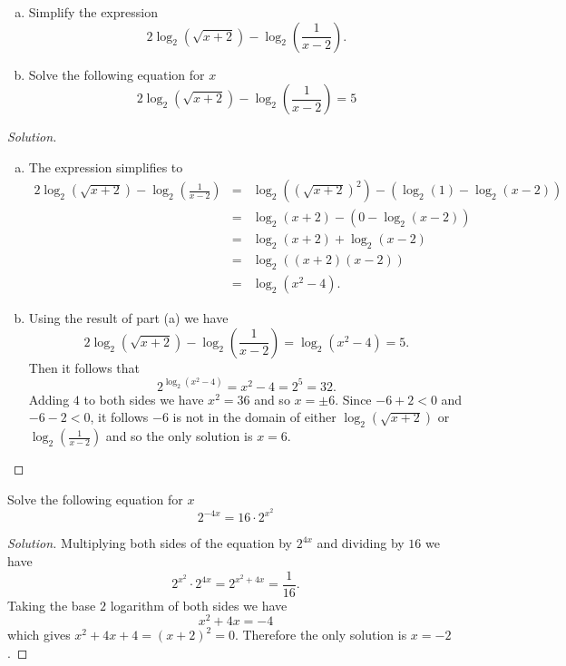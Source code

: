 \documentclass[12pt]{amsart}
\begin{document}
\begin{thm}[16 Points]\label{ex9}
  \begin{enumerate}[(a)]
  \item
    Simplify the expression 
    $$2\log_2(\sqrt{x + 2}) - \log_2\left(\frac{1}{x - 2}\right).$$
  \item
    Solve the following equation for $x$
    $$ 2\log_2(\sqrt{x + 2}) - \log_2\left(\frac{1}{x - 2}\right) = 5 $$
  \end{enumerate}
  
  \begin{proof}[Solution]
    \begin{enumerate}[(a)]
    \item
      The expression simplifies to 
      \begin{eqnarray*}
        2\log_2(\sqrt{x + 2}) - \log_2\left(\frac{1}{x - 2}\right) &=& \log_2((\sqrt{x + 2})^2) - (\log_2(1) -\log_2(x - 2))\\
        &=& \log_2(x + 2) - (0 -  \log_2(x - 2))\\
        &=& \log_2(x + 2) + \log_2(x - 2)\\
        &=& \log_2((x + 2)(x - 2))\\
        &=& \log_2(x^2 - 4).
      \end{eqnarray*}
    \item
      Using the result of part (a) we have
      $$2\log_2(\sqrt{x + 2}) - \log_2\left(\frac{1}{x - 2}\right) = \log_2(x^2 - 4) = 5.$$
      Then it follows that
      $$2^{\log_2(x^2 - 4)} = x^2 - 4 = 2^5 = 32.$$
      Adding $4$ to both sides we have $x^2 = 36$ and so $x = \pm 6$.
      Since $-6 + 2 < 0$ and $-6 - 2 < 0$, it follows $-6$ is not in the domain of either $\log_2(\sqrt{x + 2})$ or $\log_2\left(\frac{1}{x -2}\right)$ and so the only solution is $x = 6$.
    \end{enumerate}
  \end{proof}
\end{thm}

\begin{thm}[16 Points]\label{ex7}
  Solve the following equation for $x$
  $$2^{-4x} = 16 \cdot 2^{x^2}$$
  
  \begin{proof}[Solution]
    Multiplying both sides of the equation by $2^{4x}$ and dividing by $16$ we have
    $$2^{x^2} \cdot 2^{4x} = 2^{x^2 + 4x} = \frac{1}{16}.$$
    Taking the base $2$ logarithm of both sides we have
    $$x^2 + 4x = -4$$
    which gives $x^2 + 4x + 4 = (x + 2)^2 = 0$.
    Therefore the only solution is $x = -2$.
  \end{proof}
\end{thm}
\end{document}

